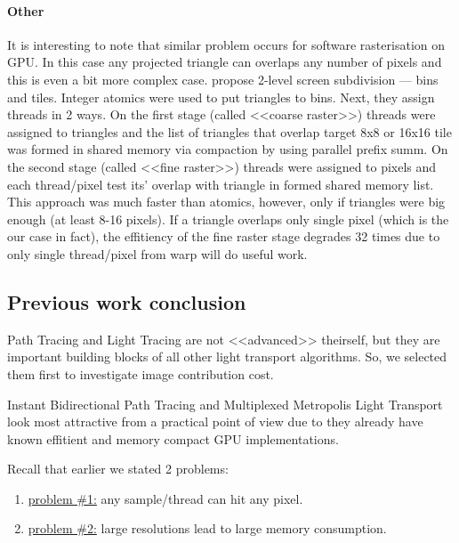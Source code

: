 \documentclass[twoside,twocolumn,10pt]{article}
\begin{document}
\paragraph{Other}

It is interesting to note that similar problem occurs for software rasterisation on GPU. In this case any projected triangle can overlaps any number of pixels and this is even a bit more complex case. \cite{Laine11} propose 2-level screen subdivision --- bins and tiles. Integer atomics were used to put triangles to bins. Next, they assign threads in 2 ways. On the first stage (called <<coarse raster>>) threads were assigned to triangles and the list of triangles that overlap target 8x8 or 16x16 tile was formed in shared memory via compaction by using parallel prefix summ. On the second stage (called <<fine raster>>) threads were assigned to pixels and each thread/pixel test its' overlap with triangle in formed shared memory list. This approach was much faster than atomics, however, only if triangles were big enough (at least 8-16 pixels). If a triangle overlaps only single pixel (which is the our case in fact), the effitiency of the fine raster stage degrades 32 times due to only single thread/pixel from warp will do useful work. 

\subsection*{Previous work conclusion}

Path Tracing and Light Tracing are not <<advanced>> theirself, but they are important building blocks of all other light transport algorithms. So, we selected them first to investigate image contribution cost.

Instant Bidirectional Path Tracing and Multiplexed Metropolis Light Transport look most attractive from a practical point of view due to they already have known effitient and memory compact GPU implementations.

Recall that earlier we stated 2 problems: 

\begin{enumerate}
	
\item \underline{problem \#1:} any sample/thread can hit any pixel. 

\item \underline{problem \#2:} large resolutions lead to large memory consumption.

\end{enumerate}
\end{document}
